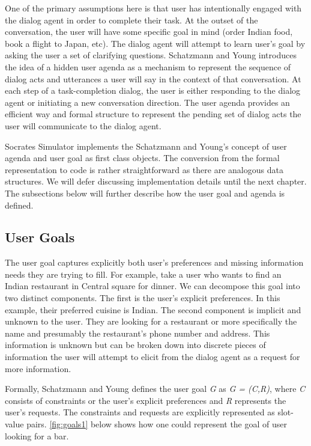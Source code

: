  One of the primary assumptions here is that user has intentionally engaged with the dialog agent in order to complete their task. At the outset of the conversation, the user will have some specific goal in mind (order Indian food, book a flight to Japan, etc). The dialog agent will attempt to learn user's goal by asking the user a set of clarifying questions. Schatzmann and Young introduces the idea of a hidden user agenda as a mechanism to represent the sequence of dialog acts and utterances a user will say in the context of that conversation. At each step of a task-completion dialog, the user is either responding to the dialog agent or initiating a new conversation direction. The user agenda provides an efficient way and formal structure to represent the pending set of dialog acts the user will communicate to the dialog agent.
 
Socrates Simulator implements the Schatzmann and Young's concept of user agenda and user goal as first class objects. The conversion from the formal representation to code is rather straightforward as there are analogous data structures. We will defer discussing implementation details until the next chapter. The subsections below will further describe how the user goal and agenda is defined. 

\subsection{User Goals} 
The user goal captures explicitly both user's preferences and missing information needs they are trying to fill. For example, take a user who wants to find an Indian restaurant in Central square for dinner. We can decompose this goal into two distinct components. The first is the user's explicit preferences. In this example, their preferred cuisine is Indian. The second component is implicit and unknown to the user. They are looking for a restaurant or more specifically the name and presumably the restaurant's phone number and address. This information is unknown but can be broken down into discrete pieces of information the user will attempt to elicit from the dialog agent as a request for more information. 

Formally, Schatzmann and Young defines the user goal \textit{G} as \textit{G = (C,R)}, where \textit{C} consists of constraints or the user's explicit preferences and \textit{R} represents the user's requests. The constraints and requests are explicitly represented as slot-value pairs. \ref{fig:goals1} below shows how one could represent the goal of user looking for a bar. 

